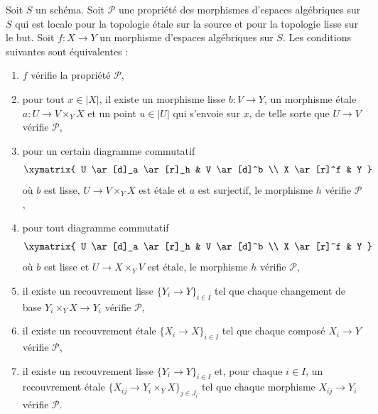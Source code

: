 \begin{lemma}
\label{lemma-etale-smooth-local-source-target-characterize}
Soit $S$ un schéma.
Soit $\mathcal{P}$ une propriété des morphismes d'espaces algébriques sur $S$
qui est locale pour la topologie étale sur la source et pour la topologie lisse sur le but.
Soit $f : X \to Y$ un morphisme
d'espaces algébriques sur $S$. Les conditions suivantes sont équivalentes :
\begin{enumerate}
\item[(a)] $f$ vérifie la propriété $\mathcal{P}$,
\item[(b)] pour tout $x \in |X|$, il existe un morphisme lisse $b : V \to Y$,
un morphisme \'etale $a : U \to V \times_Y X$ et un point $u \in |U|$
qui s'envoie sur $x$, de telle sorte que $U \to V$ vérifie $\mathcal{P}$,
\item[(c)] pour un certain diagramme commutatif
$$
\xymatrix{
U \ar[d]_a \ar[r]_h & V \ar[d]^b \\
X \ar[r]^f & Y
}
$$
où $b$ est lisse, $U \to V \times_Y X$ est \'etale et $a$ est surjectif,
le morphisme $h$ vérifie $\mathcal{P}$,
\item[(d)] pour tout diagramme commutatif
$$
\xymatrix{
U \ar[d]_a \ar[r]_h & V \ar[d]^b \\
X \ar[r]^f & Y
}
$$
où $b$ est lisse et $U \to X \times_Y V$ est \'etale, le morphisme $h$
vérifie $\mathcal{P}$,
\item[(e)] il existe un recouvrement lisse $\{Y_i \to Y\}_{i \in I}$ tel
que chaque changement de base $Y_i \times_Y X \to Y_i$ vérifie $\mathcal{P}$,
\item[(f)] il existe un recouvrement \'etale $\{X_i \to X\}_{i \in I}$ tel
que chaque composé $X_i \to Y$ vérifie $\mathcal{P}$,
\item[(g)] il existe un recouvrement lisse $\{Y_i \to Y\}_{i \in I}$ et,
pour chaque $i \in I$, un recouvrement \'etale
$\{X_{ij} \to Y_i \times_Y X\}_{j \in J_i}$ tel que chaque morphisme
$X_{ij} \to Y_i$ vérifie $\mathcal{P}$.
\end{enumerate}
\end{lemma}

